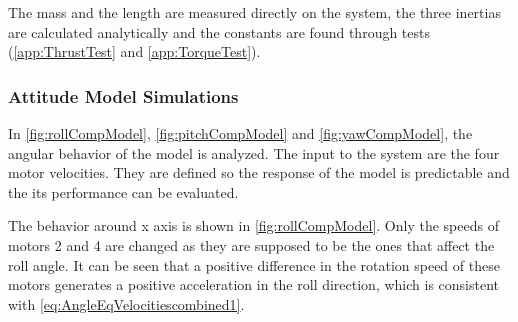The mass and the length are measured directly on the system, the three inertias are calculated analytically and the constants are found through tests (\autoref{app:ThrustTest} and \ref{app:TorqueTest}).

\subsubsection{Attitude Model Simulations}
In \autoref{fig:rollCompModel}, \ref{fig:pitchCompModel} and \ref{fig:yawCompModel}, the angular behavior of the model is analyzed. The input to the system are the four motor velocities. They are defined so the response of the model is predictable and the its performance can be evaluated.

The behavior around x axis is shown in \autoref{fig:rollCompModel}. Only the speeds of motors 2 and 4 are changed as they are supposed to be the ones that affect the roll angle. It can be seen that a positive difference in the rotation speed of these motors generates a positive acceleration in the roll direction, which is consistent with \autoref{eq:AngleEqVelocitiescombined1}.

